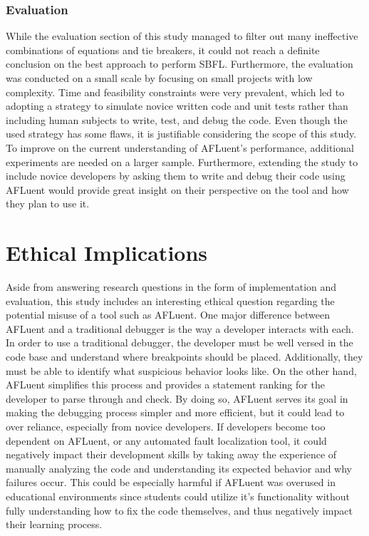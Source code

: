 \subsubsection{Evaluation}

While the evaluation section of this study managed to filter out many
ineffective combinations of equations and tie breakers, it could not reach a
definite conclusion on the best approach to perform SBFL. Furthermore, the
evaluation was conducted on a small scale by focusing on small projects with low
complexity. Time and feasibility constraints were very prevalent, which led to
adopting a strategy to simulate novice written code and unit tests rather than
including human subjects to write, test, and debug the code. Even though
the used strategy has some flaws, it is justifiable considering the scope of this
study. To improve on
the current understanding of AFLuent's performance,
additional experiments are needed on a larger sample. Furthermore, extending the
study to include novice developers by asking them to write and debug their code
using AFLuent would provide great insight on their perspective on the tool
and how they plan to use it.

\section{Ethical Implications}

Aside from answering research questions in the form of implementation and
evaluation, this study includes an interesting ethical question regarding the
potential misuse of a tool such as AFLuent. One major difference between AFLuent
and a traditional debugger is the way a developer interacts with each. In order
to use a traditional debugger, the developer must be well versed in the code
base and understand where breakpoints should be placed. Additionally, they must
be able to identify what suspicious behavior looks like. On the other hand,
AFLuent simplifies this process and provides a statement ranking for the
developer to parse through and check. By doing so, AFLuent serves its goal in
making the debugging process simpler and more efficient, but it could lead to
over reliance, especially from novice developers. If developers become too
dependent on AFLuent, or any automated fault localization tool, it could
negatively impact their development skills by taking away the experience of
manually analyzing the code and understanding its expected behavior and why
failures occur. This could be especially harmful if AFLuent was overused in
educational environments since students could utilize it's functionality without
fully understanding how to fix the code themselves, and thus negatively impact
their learning process.